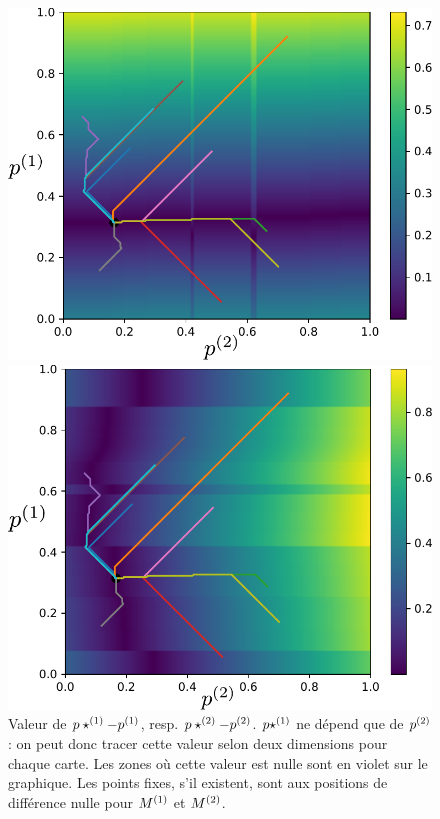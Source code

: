 \begin{figure}
\begin{minipage}{0.5\textwidth}
\centering
\includegraphics[width=\textwidth]{champ_X_006.pdf}
\end{minipage}
\begin{minipage}{0.5\textwidth}
\centering
\includegraphics[width=\textwidth]{champ_Y_006.pdf}
\end{minipage}
\caption{Valeur de $p\star^{({1})} - p^{({1})}$, resp. $p\star^{({2})} - p^{({2})}$. $p\star^{({1})}$ ne dépend que de $p^{({2})}$ : on peut donc tracer cette valeur selon deux dimensions pour chaque carte. Les zones où cette valeur est nulle sont en violet sur le graphique. Les points fixes, s'il existent, sont aux positions de différence nulle pour $M^{({1})}$ et $M^{({2})}$.}
\label{fig:diff_relax}
\end{figure}

